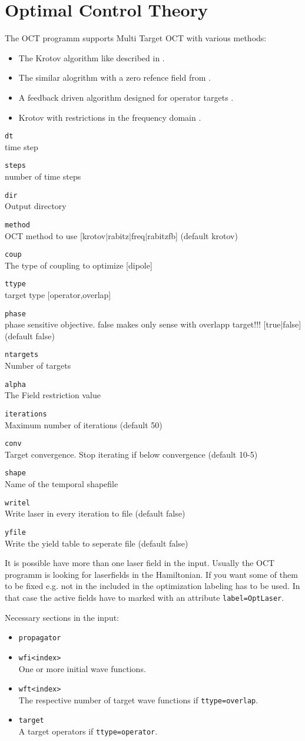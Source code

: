 \documentclass[a4paper,12pt]{scrbook}
\newcommand{\option}[2]{\item \texttt{#1}\\ #2}
\newcommand{\code}[1]{\texttt{#1}}
\begin{document}
\section{Optimal Control Theory}
The OCT programm supports Multi Target OCT with various methods:
\begin{itemize}
 \item The Krotov algorithm like described in \cite{Palao03}.
 \item The similar alogrithm with a zero refence field from \cite{Zhu98}.
 \item A feedback driven algorithm designed for operator targets \cite{Zhu98FB}.
 \item Krotov with restrictions in the frequency domain \cite{Gollub08,Gollub10}.
\end{itemize}

\begin{options}
\option{dt}{time step}
\option{steps}{number of time steps}
\option{dir}{Output directory}
\option{method}{OCT method to use [krotov$|$rabitz$|$freq$|$rabitzfb] (default krotov)}
\option{coup}{The type of coupling to optimize [dipole]}
\option{ttype}{target type [operator,overlap]}
\option{phase}{phase sensitive objective. false makes only sense with overlapp target!!! [true|false] (default false)}
\option{ntargets}{Number of targets}
\option{alpha}{The Field restriction value}
\option{iterations}{Maximum number of iterations (default 50)}
\option{conv}{Target convergence. Stop iterating if below convergence (default 10-5)}
\option{shape}{Name of the temporal shapefile}
\option{writel}{Write laser in every iteration to file (default false)}
\option{yfile}{Write the yield table to seperate file (default false)}
\end{options}
It is possible have more than one laser field in the input. Usually the OCT programm
is looking for laserfields in the Hamiltonian. If you want some of them to be fixed e.g. not in
the included in the optimization labeling has to be used.
In that case the active fields have to marked with an attribute \verb|label=OptLaser|.

Necessary sections in the input:
\begin{itemize}
 \option{propagator}{}
 \option{wfi<index>}{One or more initial wave functions.}
 \option{wft<index>}{The respective number of target wave functions if \code{ttype=overlap}.}
 \option{target}{A target operators if \code{ttype=operator}.}
\end{itemize}
\end{document}
